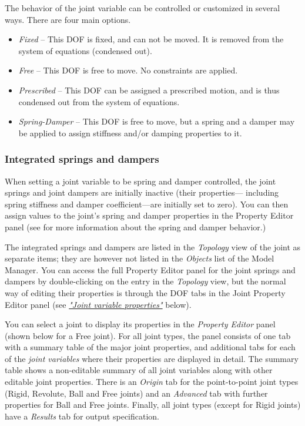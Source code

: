 The behavior of the joint variable can be controlled or customized in
several ways. There are four main options.

\begin{itemize}
\item{\sl Fixed} --
  This DOF is fixed, and can not be moved.
  It is removed from the system of equations (condensed out).
\item{\sl Free} --
  This DOF is free to move. No constraints are applied.
\item{\sl Prescribed} --
  This DOF can be assigned a prescribed motion,
  and is thus condensed out from the system of equations.
\item{\sl Spring-Damper} --
  This DOF is free to move, but a spring and a damper may be applied
  to assign stiffness and/or damping properties to it.
\end{itemize}


\subsubsection{Integrated springs and dampers}

When setting a joint variable to be spring and damper controlled,
the joint springs and joint dampers are initially inactive (their properties---
including spring stiffness and damper coefficient---are initially set to zero).
You can then assign values to the joint's spring and damper properties in the
Property Editor panel (see
for more information about the spring and damper behavior.)

The integrated springs and dampers are listed in the {\sl Topology}
view of the joint as separate items; they are however not listed in the
{\sl Objects} list of the Model Manager. You can access the full
Property Editor panel for the joint springs and dampers by
double-clicking on the entry in the {\sl Topology} view, but the normal
way of editing their properties is through the DOF tabs in the Joint
Property Editor panel (see
\protect\hyperlink{joint-variable-properties}{\sl"Joint variable properties"}
below).



You can select a joint to display its properties in the {\sl Property Editor}
panel (shown below for a Free joint). For all joint types, the panel consists of
one tab with a summary table of the major joint properties, and additional tabs
for each of the {\sl joint variables} where their properties are displayed in
detail. The summary table shows a non-editable summary of all joint variables
along with other editable joint properties.
There is an {\sl Origin} tab for the point-to-point joint types
(Rigid, Revolute, Ball and Free joints) and an {\sl Advanced} tab with further
properties for Ball and Free joints.
Finally, all joint types (except for Rigid joints) have a {\sl Results}
tab for output specification.

